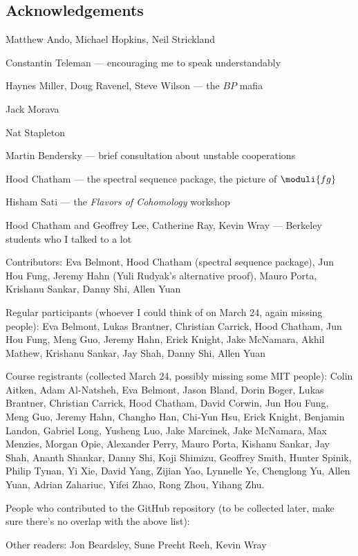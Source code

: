 


\newpage

\subsection*{Acknowledgements}

Matthew Ando, Michael Hopkins, Neil Strickland

Constantin Teleman --- encouraging me to speak understandably

Haynes Miller, Doug Ravenel, Steve Wilson --- the $BP$ mafia

Jack Morava

Nat Stapleton

Martin Bendersky --- brief consultation about unstable cooperations

Hood Chatham --- the spectral sequence package, the picture of $\moduli{fg}$

Hisham Sati --- the \textit{Flavors of Cohomology} workshop

Hood Chatham and Geoffrey Lee, Catherine Ray, Kevin Wray --- Berkeley students who I talked to a lot





Contributors: Eva Belmont, Hood Chatham (spectral sequence package), Jun Hou Fung, Jeremy Hahn (Yuli Rudyak's alternative proof), Mauro Porta, Krishanu Sankar, Danny Shi, Allen Yuan

Regular participants (whoever I could think of on March 24, again missing people): Eva Belmont, Lukas Brantner, Christian Carrick, Hood Chatham, Jun Hou Fung, Meng Guo, Jeremy Hahn, Erick Knight, Jake McNamara, Akhil Mathew, Krishanu Sankar, Jay Shah, Danny Shi, Allen Yuan

Course registrants (collected March 24, possibly missing some MIT people): Colin Aitken, Adam Al-Natsheh, Eva Belmont, Jason Bland, Dorin Boger, Lukas Brantner, Christian Carrick, Hood Chatham, David Corwin, Jun Hou Fung, Meng Guo, Jeremy Hahn, Changho Han, Chi-Yun Hsu, Erick Knight, Benjamin Landon, Gabriel Long, Yusheng Luo, Jake Marcinek, Jake McNamara, Max Menzies, Morgan Opie, Alexander Perry, Mauro Porta, Kishanu Sankar, Jay Shah, Ananth Shankar, Danny Shi, Koji Shimizu, Geoffrey Smith, Hunter Spinik, Philip Tynan, Yi Xie, David Yang, Zijian Yao, Lynnelle Ye, Chenglong Yu, Allen Yuan, Adrian Zahariuc, Yifei Zhao, Rong Zhou, Yihang Zhu.

People who contributed to the GitHub repository (to be collected later, make sure there's no overlap with the above list): 

Other readers: Jon Beardsley, Sune Precht Reeh, Kevin Wray

